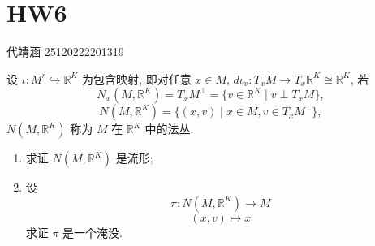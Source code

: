 \documentclass[../main.tex]{subfiles}
\begin{document}
\ifSubfilesClassLoaded{

    
    \setcounter{chapter}{5}
}{}

\chapter{ HW6 }
 代靖涵 25120222201319
\begin{exercise}{}{}
设 $\iota: M^r \hookrightarrow \mathbb{R}^K$ 为包含映射, 即对任意 $x \in M$, $d\iota_x: T_xM \to T_x\mathbb{R}^K \cong \mathbb{R}^K$, 若
$$N_x(M,\mathbb{R}^K) = T_xM^\perp = \{v \in \mathbb{R}^K \mid v \perp T_xM\},$$
$$N(M,\mathbb{R}^K) = \{(x,v) \mid x \in M, v \in T_xM^\perp\},$$
$N(M,\mathbb{R}^K)$ 称为 $M$ 在 $\mathbb{R}^K$ 中的法丛.
\begin{enumerate}
\item 求证 $N(M,\mathbb{R}^K)$ 是流形;
\item 设
$$\pi: N(M,\mathbb{R}^K) \to M$$
$$(x,v) \mapsto x$$
求证 $\pi$ 是一个淹没.
\end{enumerate}
\end{exercise}
\end{document}
